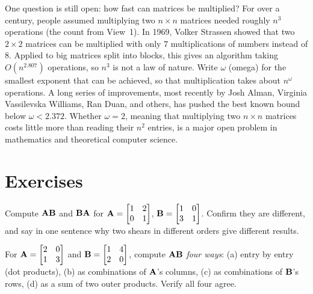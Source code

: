 \begin{historybox}
One question is still open: how fast can matrices be multiplied? For over a century, people assumed
multiplying two $n\times n$ matrices needed roughly $n^3$ operations (the count from View~1). In 1969,
Volker Strassen showed that two $2\times 2$ matrices can be multiplied with
only $7$ multiplications of numbers instead of $8$. Applied to big matrices split into blocks, this gives an
algorithm taking $O(n^{2.807})$ operations, so $n^3$ is not a law of nature. Write $\omega$ (omega) for the smallest
exponent that can be achieved, so that multiplication takes about $n^{\omega}$ operations. A long series of
improvements, most recently by Josh Alman, Virginia Vassilevska Williams, Ran Duan, and others, has pushed the best
known bound below $\omega < 2.372$. Whether $\omega = 2$, meaning that multiplying two $n\times n$ matrices costs
little more than reading their $n^2$ entries, is a major open problem in mathematics
and theoretical computer science.
\end{historybox}

\section{Exercises}
\label{ch08:exercises}

\begin{exercise}
Compute $\mathbf{A}\mathbf{B}$ and $\mathbf{B}\mathbf{A}$ for
$\mathbf{A} = \begin{bmatrix} 1 & 2 \\ 0 & 1 \end{bmatrix}$,
$\mathbf{B} = \begin{bmatrix} 1 & 0 \\ 3 & 1 \end{bmatrix}$. Confirm they are different, and
say in one sentence why two shears in different orders give different results.
\end{exercise}

\begin{exercise}
For $\mathbf{A} = \begin{bmatrix} 2 & 0 \\ 1 & 3 \end{bmatrix}$ and
$\mathbf{B} = \begin{bmatrix} 1 & 4 \\ 2 & 0 \end{bmatrix}$, compute $\mathbf{A}\mathbf{B}$
\emph{four ways}: (a) entry by entry (dot products), (b) as combinations of $\mathbf{A}$'s
columns, (c) as combinations of $\mathbf{B}$'s rows, (d) as a sum of two outer products.
Verify all four agree.
\end{exercise}

